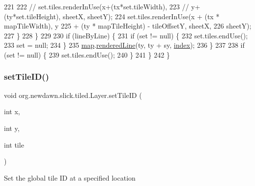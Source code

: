 \begin{DoxyCode}
221 
222                     \textcolor{comment}{// set.tiles.renderInUse(x+(tx*set.tileWidth),}
223                     \textcolor{comment}{// y+(ty*set.tileHeight), sheetX, sheetY);}
224                     \textcolor{keyword}{set}.tiles.renderInUse(x + (tx * mapTileWidth), y
225                             + (ty * mapTileHeight) - tileOffsetY, sheetX,
226                             sheetY);
227                 \}
228             \}
229 
230             \textcolor{keywordflow}{if} (lineByLine) \{
231                 \textcolor{keywordflow}{if} (\textcolor{keyword}{set} != null) \{
232                     \textcolor{keyword}{set}.tiles.endUse();
233                     \textcolor{keyword}{set} = null;
234                 \}
235                 \mbox{\hyperlink{classorg_1_1newdawn_1_1slick_1_1tiled_1_1_layer_ad6494d6da75ffb77cacdec8d38d74982}{map}}.\mbox{\hyperlink{classorg_1_1newdawn_1_1slick_1_1tiled_1_1_tiled_map_acf9160a21ea260cfce93e14567252781}{renderedLine}}(ty, ty + sy, \mbox{\hyperlink{classorg_1_1newdawn_1_1slick_1_1tiled_1_1_layer_ab1bb4ba1300c8e2d08bdbcefa14ab60e}{index}});
236             \}
237 
238             \textcolor{keywordflow}{if} (\textcolor{keyword}{set} != null) \{
239                 \textcolor{keyword}{set}.tiles.endUse();
240             \}
241         \}
242     \}
\end{DoxyCode}
\mbox{\label{classorg_1_1newdawn_1_1slick_1_1tiled_1_1_layer_a8529c961c803882ae6be3ba7b49b995a}} 
\subsubsection{\texorpdfstring{set\+Tile\+I\+D()}{setTileID()}}
{\footnotesize\ttfamily void org.\+newdawn.\+slick.\+tiled.\+Layer.\+set\+Tile\+ID (\begin{DoxyParamCaption}\item[{int}]{x,  }\item[{int}]{y,  }\item[{int}]{tile }\end{DoxyParamCaption})\hspace{0.3cm}{\ttfamily [inline]}}

Set the global tile ID at a specified location


